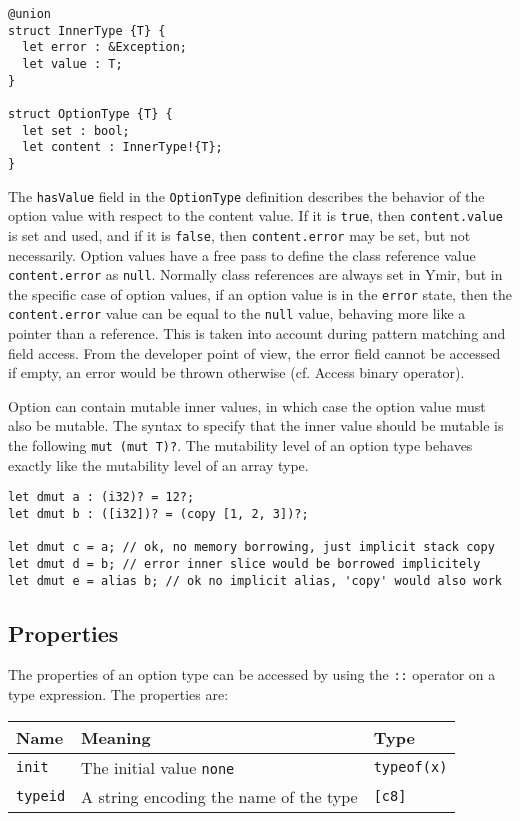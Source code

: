 \begin{lstlisting}[style=coloredverbatim]
@union
struct InnerType {T} {
  let error : &Exception;
  let value : T;
}

struct OptionType {T} {
  let set : bool;
  let content : InnerType!{T};
}
\end{lstlisting}

The \texttt{hasValue} field in the \texttt{OptionType} definition describes the
behavior of the option value with respect to the content value. If it is
\texttt{true}, then \texttt{content.value} is set and used, and if it is
\texttt{false}, then \texttt{content.error} may be set, but not necessarily.
Option values have a free pass to define the class reference value
\texttt{content.error} as \texttt{null}. Normally class references are always
set in Ymir, but in the specific case of option values, if an option value is in
the \texttt{error} state, then the \texttt{content.error} value can be equal to
the \texttt{null} value, behaving more like a pointer than a reference. This is
taken into account during pattern matching and field access. From the developer
point of view, the error field cannot be accessed if empty, an error would be
thrown otherwise (cf. Access binary operator).

Option can contain mutable inner values, in which case the option value must
also be mutable. The syntax to specify that the inner value should be mutable is
the following \texttt{mut (mut T)?}. The mutability level of an option type
behaves exactly like the mutability level of an array type.

\begin{lstlisting}[style=coloredverbatim]
let dmut a : (i32)? = 12?;
let dmut b : ([i32])? = (copy [1, 2, 3])?;

let dmut c = a; // ok, no memory borrowing, just implicit stack copy
let dmut d = b; // error inner slice would be borrowed implicitely
let dmut e = alias b; // ok no implicit alias, 'copy' would also work
\end{lstlisting}

\subsection{Properties}

The properties of an option type can be accessed by using the \texttt{::} operator on a type expression. The properties are:

\begin{center}\begin{adjustbox}{max width=\linewidth}
  \begin{tabular}{|l|ll|}
    \hline
    Name & Meaning & Type\\
    \hline
    \hline
    \texttt{init} & The initial value \texttt{none} & \texttt{typeof(x)}\\
    \hline
    \texttt{typeid} & A string encoding the name of the type & \texttt{[c8]} \\
    \hline
  \end{tabular}
\end{adjustbox}\end{center}

